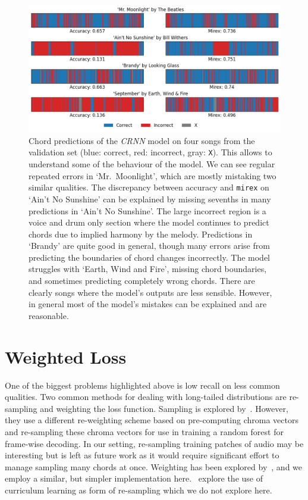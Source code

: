 \begin{figure}[H]
    \centering
    \includegraphics[width=1.0\textwidth]{figures/chord_recognition_examples.png}
    \caption{Chord predictions of the \emph{CRNN} model on four songs from the validation set (blue: correct, red: incorrect, gray: \texttt{X}). This allows to understand some of the behaviour of the model. We can see regular repeated errors in `Mr.\ Moonlight', which are mostly mistaking two similar qualities. The discrepancy between accuracy and \texttt{mirex} on `Ain't No Sunshine' can be explained by missing sevenths in many predictions in `Ain't No Sunshine'. The large incorrect region is a voice and drum only section where the model continues to predict chords due to implied harmony by the melody. Predictions in `Brandy' are quite good in general, though many errors arise from predicting the boundaries of chord changes incorrectly. The model struggles with `Earth,  Wind and Fire', missing chord boundaries, and sometimes predicting completely wrong chords. There are clearly songs where the model's outputs are less sensible. However, in general most of the model's mistakes can be explained and are reasonable.}\label{fig:crnn_examples}
\end{figure}

\section{Weighted Loss}

One of the biggest problems highlighted above is low recall on less common qualities. Two common methods for dealing with long-tailed distributions are re-sampling and weighting the loss function. Sampling is explored by~\citet{BalanceRandomForestACR}. However, they use a different re-weighting scheme based on pre-computing chroma vectors and re-sampling these chroma vectors for use in training a random forest for frame-wise decoding. In our setting, re-sampling training patches of audio may be interesting but is left as future work as it would require significant effort to manage sampling many chords at once. Weighting has been explored by~\citet{ACRLargeVocab1}, and we employ a similar, but simpler implementation here.~\citet{CurriculumLearning} explore the use of curriculum learning as form of re-sampling which we do not explore here.

